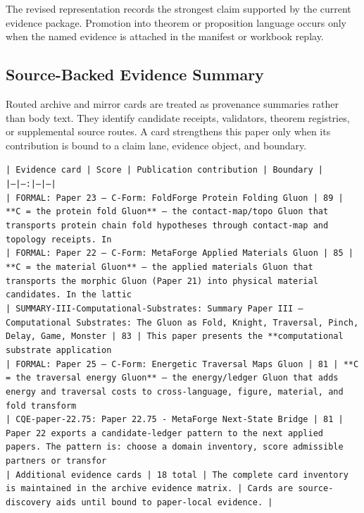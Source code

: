 \documentclass[11pt]{article}
\begin{document}
The revised representation records the strongest claim supported by the current evidence package. Promotion into theorem or proposition language occurs only when the named evidence is attached in the manifest or workbook replay.

\subsection*{Source-Backed Evidence Summary}

Routed archive and mirror cards are treated as provenance summaries rather than
body text. They identify candidate receipts, validators, theorem registries, or
supplemental source routes. A card strengthens this paper only when its
contribution is bound to a claim lane, evidence object, and boundary.

\noindent\texttt{| Evidence card | Score | Publication contribution | Boundary |}\\
\noindent\texttt{|---|---:|---|---|}\\
\noindent\texttt{| FORMAL: Paper 23 — C-Form: FoldForge Protein Folding Gluon | 89 | **C = the protein fold Gluon** — the contact-map/topo Gluon that transports protein chain fold hypotheses through contact-map and topology receipts. In }\\
\noindent\texttt{| FORMAL: Paper 22 — C-Form: MetaForge Applied Materials Gluon | 85 | **C = the material Gluon** — the applied materials Gluon that transports the morphic Gluon (Paper 21) into physical material candidates. In the lattic}\\
\noindent\texttt{| SUMMARY-III-Computational-Substrates: Summary Paper III — Computational Substrates: The Gluon as Fold, Knight, Traversal, Pinch, Delay, Game, Monster | 83 | This paper presents the **computational substrate application}\\
\noindent\texttt{| FORMAL: Paper 25 — C-Form: Energetic Traversal Maps Gluon | 81 | **C = the traversal energy Gluon** — the energy/ledger Gluon that adds energy and traversal costs to cross-language, figure, material, and fold transform}\\
\noindent\texttt{| CQE-paper-22.75: Paper 22.75 - MetaForge Next-State Bridge | 81 | Paper 22 exports a candidate-ledger pattern to the next applied papers. The pattern is: choose a domain inventory, score admissible partners or transfor}\\
\noindent\texttt{| Additional evidence cards | 18 total | The complete card inventory is maintained in the archive evidence matrix. | Cards are source-discovery aids until bound to paper-local evidence. |}\\
\end{document}
